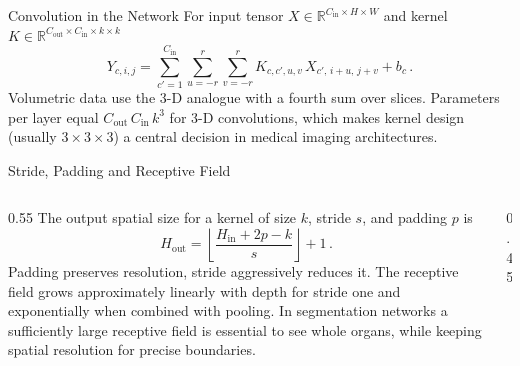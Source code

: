 \begin{frame}{Convolution in the Network}
    For input tensor $X \in \mathbb{R}^{C_\mathrm{in}\times H\times W}$ and kernel $K \in \mathbb{R}^{C_\mathrm{out}\times C_\mathrm{in}\times k\times k}$
    \begin{equation*}
        Y_{c,i,j} = \sum_{c'=1}^{C_\mathrm{in}} \sum_{u=-r}^{r} \sum_{v=-r}^{r} K_{c,c',u,v}\, X_{c',\,i+u,\,j+v} + b_c\,.
    \end{equation*}
    Volumetric data use the 3-D analogue with a fourth sum over slices. Parameters per layer equal $C_\mathrm{out}\, C_\mathrm{in}\, k^3$ for 3-D convolutions, which makes kernel design (usually $3{\times}3{\times}3$) a central decision in medical imaging architectures.
\end{frame}

\begin{frame}{Stride, Padding and Receptive Field}
    \begin{columns}[T, onlytextwidth]
        \begin{column}{0.55\textwidth}
            The output spatial size for a kernel of size $k$, stride $s$, and padding $p$ is
            \begin{equation*}
                H_\mathrm{out} = \left\lfloor \frac{H_\mathrm{in} + 2p - k}{s}\right\rfloor + 1\,.
            \end{equation*}
            Padding preserves resolution, stride aggressively reduces it. The receptive field grows approximately linearly with depth for stride one and exponentially when combined with pooling. In segmentation networks a sufficiently large receptive field is essential to see whole organs, while keeping spatial resolution for precise boundaries.
        \end{column}
        \begin{column}{0.45\textwidth}
        \end{column}
    \end{columns}
\end{frame}

